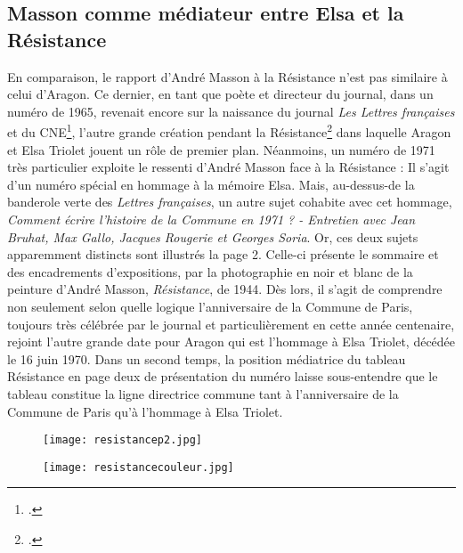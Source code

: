 \subsection{Masson comme médiateur entre Elsa et la Résistance}

En comparaison, le rapport d’André Masson à la Résistance n’est pas similaire à celui d’Aragon. Ce dernier, en tant que poète et  directeur du journal, dans un numéro de  1965,  revenait encore  sur la naissance du journal \emph{Les Lettres françaises} et du CNE\footcite{histoirecnetriolet}, l’autre grande création pendant la Résistance\footcite{specialelsa} dans laquelle Aragon et Elsa Triolet jouent un rôle de premier plan. Néanmoins, un numéro de 1971 très particulier exploite le ressenti d’André Masson face à la Résistance : Il s’agit d’un numéro spécial en hommage à la mémoire Elsa. Mais, au-dessus-de la banderole verte des \emph{Lettres françaises}, un autre sujet cohabite avec cet hommage, \emph{Comment écrire l’histoire de la Commune en 1971 ? - Entretien avec Jean Bruhat, Max Gallo, Jacques Rougerie et Georges Soria}. Or, ces deux sujets apparemment distincts sont illustrés la page 2. Celle-ci présente le sommaire et des encadrements d’expositions, par la photographie en noir et blanc de la peinture d’André Masson, \emph{Résistance}, de 1944. Dès lors, il s’agit de comprendre non seulement selon quelle logique l’anniversaire de la Commune de Paris, toujours très célébrée par le journal et particulièrement en cette année centenaire, rejoint l’autre grande date pour Aragon qui est l’hommage à Elsa Triolet, décédée le 16 juin 1970. Dans un second temps, la position médiatrice du tableau Résistance en page deux de présentation du numéro laisse sous-entendre que le tableau constitue la ligne directrice commune tant à l’anniversaire de la Commune de Paris qu’à l’hommage à Elsa Triolet. 


\begin{figure}[H]
   \centering
   \texttt{[image: resistancep2.jpg]}
	\caption{\cite{specialelsa}}\label{fig:Resistance}
\end{figure}

\begin{figure}[H]
   \centering
   \texttt{[image: resistancecouleur.jpg]}
	\caption{\cite{specialelsa}}\label{fig:Resistancecouleur}
\end{figure}


